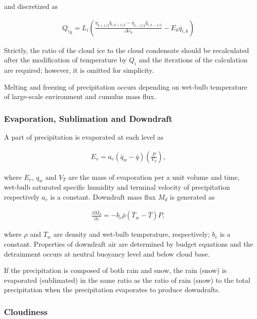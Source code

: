 and discretized as

\begin{eqnarray}
 {Q_i}_k = L_i \left(\frac{\eta_{k+1/2} \hat{q}_{i,k+1/2} - \eta_{k-1/2} \hat{q}_{i,k-1/2}}{\Delta z_k} - E_k \bar{q}_{i,k} \right)
\end{eqnarray}

Strictly, the ratio of the cloud ice to the cloud condensate should be recalculated after the modification of temperature by \(Q_i\) and the iterations of the calculation are required; however, it is
omitted for simplicity.

Melting and freezing of precipitation occurs depending on wet-bulb temperature of large-scale environment and cumulus mass flux.

\hypertarget{evaporation-sublimation-and-downdraft}{%
\subsubsection{Evaporation, Sublimation and Downdraft}\label{evaporation-sublimation-and-downdraft}}

A part of precipitation is evaporated at each level as

\begin{eqnarray}
 E_v = a_e (\bar{q}_w - \bar{q}) \left(\frac{P}{V_T}\right),
\end{eqnarray}

where \(E_v\), \(q_w\) and \(V_T\) are the mass of evaporation per a unit volume and time, wet-bulb saturated specific humidity and terminal velocity of precipitation respectively \(a_e\) is a
constant. Downdraft mass flux \(M_d\) is generated as

\begin{eqnarray}
 \frac{\partial M_d}{\partial z} = -b_e \bar{\rho} (\bar{T}_w - \bar{T}) P,
\end{eqnarray}

where \(\rho\) and \(T_w\) are density and wet-bulb temperature, respectively; \(b_e\) is a constant. Properties of downdraft air are determined by budget equations and the detrainment occurs at
neutral buoyancy level and below cloud base.

If the precipitation is composed of both rain and snow, the rain (snow) is evaporated (sublimated) in the same ratio as the ratio of rain (snow) to the total precipitation when the precipitation
evaporates to produce downdrafts.

\hypertarget{cloudiness}{%
\subsubsection{Cloudiness}\label{cloudiness}}

